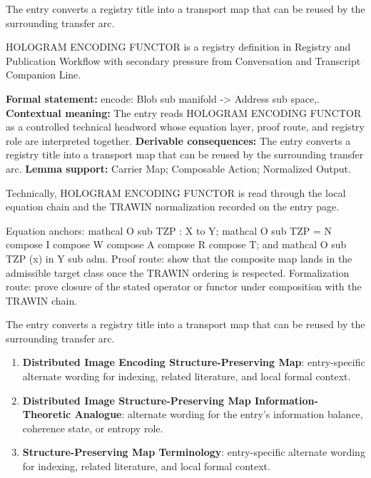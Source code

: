 The entry converts a registry title into a transport map that can be reused by the surrounding transfer arc.
\clearpage


\begingroup\small
{}
HOLOGRAM ENCODING FUNCTOR is a registry definition in Registry and Publication Workflow with secondary pressure from Conversation and Transcript Companion Line.

\begingroup\footnotesize\setlength{\emergencystretch}{3em}\sloppy
\textbf{Formal statement:} encode: Blob sub manifold -> Address sub space,. \textbf{Contextual meaning:} The entry reads HOLOGRAM ENCODING FUNCTOR as a controlled technical headword whose equation layer, proof route, and registry role are interpreted together. \textbf{Derivable consequences:} The entry converts a registry title into a transport map that can be reused by the surrounding transfer arc. \textbf{Lemma support:} Carrier Map; Composable Action; Normalized Output.\par
\endgroup

Technically, HOLOGRAM ENCODING FUNCTOR is read through the local equation chain and the TRAWIN normalization recorded on the entry page.

Equation anchors: mathcal O sub TZP : X to Y; mathcal O sub TZP = N compose I compose W compose A compose R compose T; and mathcal O sub TZP (x) in Y sub adm. Proof route: show that the composite map lands in the admissible target class once the TRAWIN ordering is respected. Formalization route: prove closure of the stated operator or functor under composition with the TRAWIN chain.

The entry converts a registry title into a transport map that can be reused by the surrounding transfer arc.
\endgroup

\begin{enumerate}[leftmargin=1.6em,itemsep=6pt,topsep=4pt]
\item \textbf{Distributed Image Encoding Structure-Preserving Map}: entry-specific alternate wording for indexing, related literature, and local formal context.
\item \textbf{Distributed Image Structure-Preserving Map Information-Theoretic Analogue}: alternate wording for the entry's information balance, coherence state, or entropy role.
\item \textbf{Structure-Preserving Map Terminology}: entry-specific alternate wording for indexing, related literature, and local formal context.
\end{enumerate}

